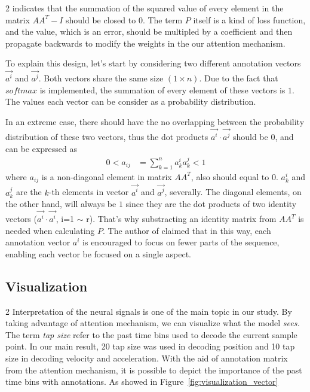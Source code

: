\begin{multicols}{2}
\noindent indicates that the summation of the squared value of every element in the matrix $A A^T - I$ should be closed to $0$.
The term $P$ itself is a kind of loss function, and the value, which is an error,
should be multipled by a coefficient and then propagate backwards to modify the weights in the our attention mechanism.

To explain this design, let's start by considering two different annotation vectors $ \vec{a^i} $ and $\vec{a^j} $.
Both vectors share the same size $(1 \times n)$.
Due to the fact that $softmax$ is implemented, the summation of every element of these vectors is $1$.
The values each vector can be consider as a probability distribution.

In an extreme case, there should have the no overlapping between the probability distribution of these two vectors, 
thus the dot products $ \vec{a^i} \cdot \vec{a^j} $ should be $0$, and can be expressed as
\begin{align}
    0 < a_{ij} &= \sum^{n}_{k=1} a^i_k a^j_k < 1
\end{align}
\noindent where $a_{ij}$ is a non-diagonal element in matrix $A A^T$, also should equal to $0$.
$ a^i_k $ and $ a^j_k $ are the $k$-th elements in vector $\vec{a^i}$ and ${\vec{a^j}}$, severally.
The diagonal elements, on the other hand,
will always be $1$ since they are the dot products of two identity vectors ($ \vec{a^i} \cdot \vec{a^i}$, i=1 $\sim$ r). 
That's why substracting an identity matrix from $A A^T$ is needed when calculating $P$.
The author of \cite{lin2017structured} claimed that in this way, 
each annotation vector $a^i$ is encouraged to focus on fewer parts of the sequence,
enabling each vector be focused on a single aspect. 

\end{multicols}

\subsection{Visualization}
\begin{multicols}{2}
Interpretation of the neural signals is one of the main topic in our study.
By taking advantage of attention mechanism, we can visualize what the model \textit{sees.} \citep{xu2015show}
The term \textit{tap size} refer to the past time bins used to decode the current sample point.
In our main result, 20 tap size was used in decoding position and 10 tap size in decoding velocity and acceleration.
With the aid of annotation matrix from the attention mechanism,
it is possible to depict the importance of the past time bins with annotations.
As showed in Figure~\ref{fig:visualization_vector}
\end{multicols}

